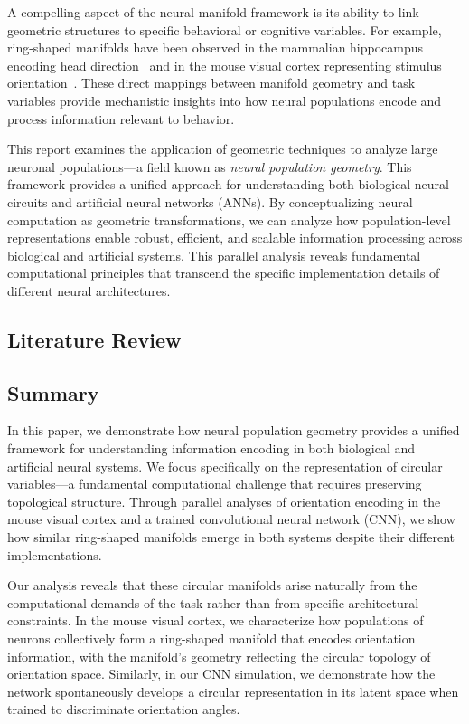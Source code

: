 \documentclass[11pt,a4paper]{article}
\begin{document}
A compelling aspect of the neural manifold framework is its ability to link geometric structures to specific behavioral or cognitive variables. For example, ring-shaped manifolds have been observed in the mammalian hippocampus encoding head direction~\cite{chaudhuri2019intrinsic} and in the mouse visual cortex representing stimulus orientation~\cite{beshkov2024topological}. These direct mappings between manifold geometry and task variables provide mechanistic insights into how neural populations encode and process information relevant to behavior.

This report examines the application of geometric techniques to analyze large neuronal populations—a field known as \textit{neural population geometry}. This framework provides a unified approach for understanding both biological neural circuits and artificial neural networks (ANNs). By conceptualizing neural computation as geometric transformations, we can analyze how population-level representations enable robust, efficient, and scalable information processing across biological and artificial systems. This parallel analysis reveals fundamental computational principles that transcend the specific implementation details of different neural architectures.

\subsection{Literature Review}
\subsection{Summary}
In this paper, we demonstrate how neural population geometry provides a unified framework for understanding information encoding in both biological and artificial neural systems. We focus specifically on the representation of circular variables—a fundamental computational challenge that requires preserving topological structure. Through parallel analyses of orientation encoding in the mouse visual cortex and a trained convolutional neural network (CNN), we show how similar ring-shaped manifolds emerge in both systems despite their different implementations.

Our analysis reveals that these circular manifolds arise naturally from the computational demands of the task rather than from specific architectural constraints. In the mouse visual cortex, we characterize how populations of neurons collectively form a ring-shaped manifold that encodes orientation information, with the manifold's geometry reflecting the circular topology of orientation space. Similarly, in our CNN simulation, we demonstrate how the network spontaneously develops a circular representation in its latent space when trained to discriminate orientation angles.
\end{document}
